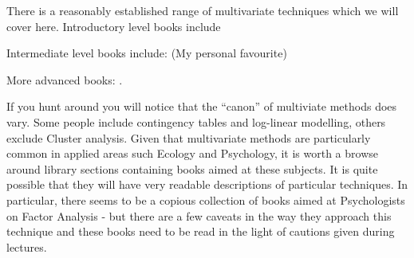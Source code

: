 

There is a reasonably established range of multivariate techniques which we will cover here.   Introductory level books include  \cite{Johnson+Wichern:2002}

Intermediate level books include:
\cite{Flury:1997} (My personal favourite)


More advanced books:
\cite{Press:1982} \cite{Srivastava+Carter:1983}.


If you hunt around you will notice that the ``canon'' of multiviate methods does vary.   Some people include contingency tables and log-linear modelling, others exclude Cluster analysis.   Given that multivariate methods are particularly common in applied areas such Ecology and Psychology, it is worth a browse around library sections containing books aimed at these subjects.   It is quite possible that they will have very readable descriptions of particular techniques.   In particular, there seems to be a copious collection of books aimed at Psychologists on Factor Analysis - but there are a few caveats in the way they approach this technique and these books need to be read in the light of cautions given during lectures.



